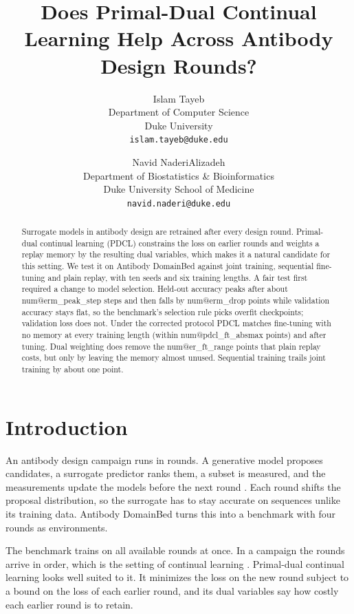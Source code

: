 \documentclass[10pt]{article}
\title{Does Primal-Dual Continual Learning Help Across Antibody Design Rounds?}
\author{Islam Tayeb\\Department of Computer Science\\Duke University\\\texttt{islam.tayeb@duke.edu}
\and Navid NaderiAlizadeh\\Department of Biostatistics \& Bioinformatics\\Duke University School of Medicine\\\texttt{navid.naderi@duke.edu}}
\date{}
\makeatletter
\newcommand{\num}[1]{\csname num@#1\endcsname}
\makeatother
\begin{document}
\maketitle

\begin{abstract}
Surrogate models in antibody design are retrained after every design round. Primal-dual continual learning (PDCL) constrains the loss on earlier rounds and weights a replay memory by the resulting dual variables, which makes it a natural candidate for this setting. We test it on Antibody DomainBed against joint training, sequential fine-tuning and plain replay, with ten seeds and six training lengths. A fair test first required a change to model selection. Held-out accuracy peaks after about \num{erm_peak_step} steps and then falls by \num{erm_drop} points while validation accuracy stays flat, so the benchmark's selection rule picks overfit checkpoints; validation loss does not. Under the corrected protocol PDCL matches fine-tuning with no memory at every training length (within \num{pdcl_ft_absmax} points) and after tuning. Dual weighting does remove the \num{er_ft_range} points that plain replay costs, but only by leaving the memory almost unused. Sequential training trails joint training by about one point.
\end{abstract}

\section{Introduction}

An antibody design campaign runs in rounds. A generative model proposes candidates, a surrogate predictor ranks them, a subset is measured, and the measurements update the models before the next round \citep{park2022propertydag,stanton2022accelerating}. Each round shifts the proposal distribution, so the surrogate has to stay accurate on sequences unlike its training data. Antibody DomainBed \citep{tagasovska2024antibody} turns this into a benchmark with four rounds as environments.

The benchmark trains on all available rounds at once. In a campaign the rounds arrive in order, which is the setting of continual learning \citep{kirkpatrick2017overcoming,delange2022continual}. Primal-dual continual learning \citep[PDCL;][]{elenter2023primal} looks well suited to it. It minimizes the loss on the new round subject to a bound on the loss of each earlier round, and its dual variables say how costly each earlier round is to retain.
\end{document}
